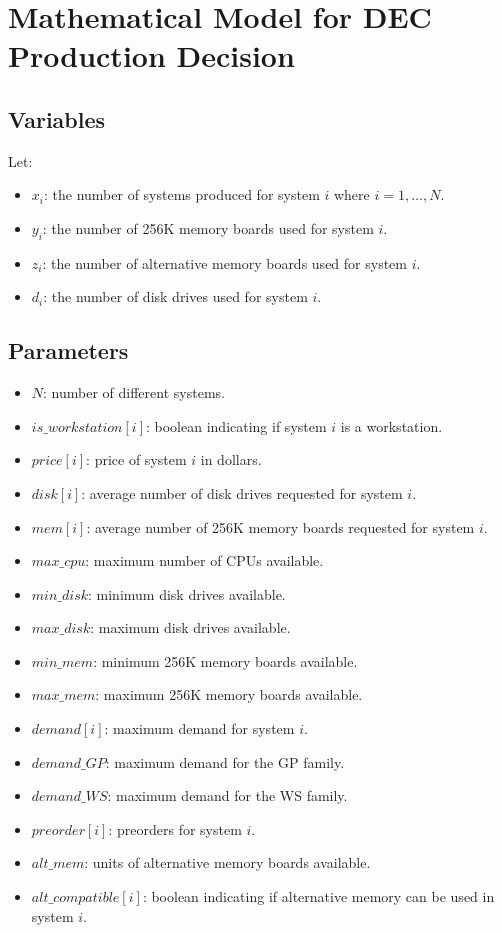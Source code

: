 \documentclass{article}
\begin{document}
\section*{Mathematical Model for DEC Production Decision}

\subsection*{Variables}
Let:
\begin{itemize}
    \item $x_i$: the number of systems produced for system $i$ where $i = 1, \ldots, N$.
    \item $y_i$: the number of 256K memory boards used for system $i$.
    \item $z_i$: the number of alternative memory boards used for system $i$.
    \item $d_i$: the number of disk drives used for system $i$.
\end{itemize}

\subsection*{Parameters}
\begin{itemize}
    \item $N$: number of different systems.
    \item $is\_workstation[i]$: boolean indicating if system $i$ is a workstation.
    \item $price[i]$: price of system $i$ in dollars.
    \item $disk[i]$: average number of disk drives requested for system $i$.
    \item $mem[i]$: average number of 256K memory boards requested for system $i$.
    \item $max\_cpu$: maximum number of CPUs available.
    \item $min\_disk$: minimum disk drives available.
    \item $max\_disk$: maximum disk drives available.
    \item $min\_mem$: minimum 256K memory boards available.
    \item $max\_mem$: maximum 256K memory boards available.
    \item $demand[i]$: maximum demand for system $i$.
    \item $demand\_GP$: maximum demand for the GP family.
    \item $demand\_WS$: maximum demand for the WS family.
    \item $preorder[i]$: preorders for system $i$.
    \item $alt\_mem$: units of alternative memory boards available.
    \item $alt\_compatible[i]$: boolean indicating if alternative memory can be used in system $i$.
\end{itemize}
\end{document}
